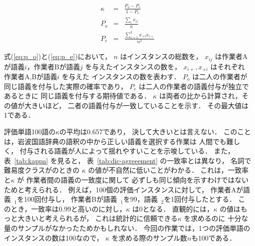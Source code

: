 \begin{eqnarray}
  \label{eq:kappa}
  \kappa & = & \frac{P_o - P_e}{1 - P_e} \\[2mm]
  \label{eq:p_o}
  P_o    & = & \frac{\sum_i x_{ii}}{n} \\[2mm]
  \label{eq:p_e}
  P_e    & = & \frac{\sum_{i=1}^k x_{+i} x_{i+}}{n^2}
\end{eqnarray}

\noindent
式(\ref{eq:p_o})と(\ref{eq:p_e})において，
$n$ はインスタンスの総数を，
$x_{ij}$ は作業者Aが語義$i$，作業者Bが語義$j$ を与えたインスタンスの数を，
$x_{i+}, x_{+i}$ はそれぞれ作業者A,Bが語義$i$ を与えた
インスタンスの数を表わす．
$P_o$ は二人の作業者が同じ語義を付与した実際の確率であり，
$P_e$ は二人の作業者の語義付与が独立であるときに
同じ語義を付与する期待値である．
$\kappa$ は両者の比から計算され，その値が大きいほど，
二者の語義付与が一致していることを示す．
その最大値は1である．

評価単語100語の$\kappa$の平均は0.657であり，
決して大きいとは言えない．
このことは，岩波国語辞典の語釈の中から正しい語義を選択する作業は
人間でも難しく，
付与される語義が人によって揺れやすいことを示唆している．
また，表~\ref{tab:kappa} を見ると，
表~\ref{tab:dic-agreeement} の一致率とは異なり，
名詞で難易度クラスが\clB のときの
$\kappa$ の値が不自然に低いことがわかる．
これは，一致率と$\kappa$ が
作業者間の語義の一致度に関して
必ずしも同じ傾向を示すわけではないためと考えられる．
例えば，100個の評価インスタンスに対して，
作業者Aが語義~$\!{}_1$を100回付与し，
作業者Bが語義~$\!{}_1$を99，語義~$\!{}_2$を1回付与したとする．
このとき，一致率は0.99と高いのに対し，$\kappa$ は0となる．
直観的には，$\kappa$ の値はもっと大きいと考えられるが，
これは統計的に信頼できる$\kappa$ を求めるのに
十分な量のサンプルがなかったためかもしれない．
今回の作業では，1つの評価単語のインスタンスの数は100なので，
$\kappa$ を求める際のサンプル数$n$も100である．

